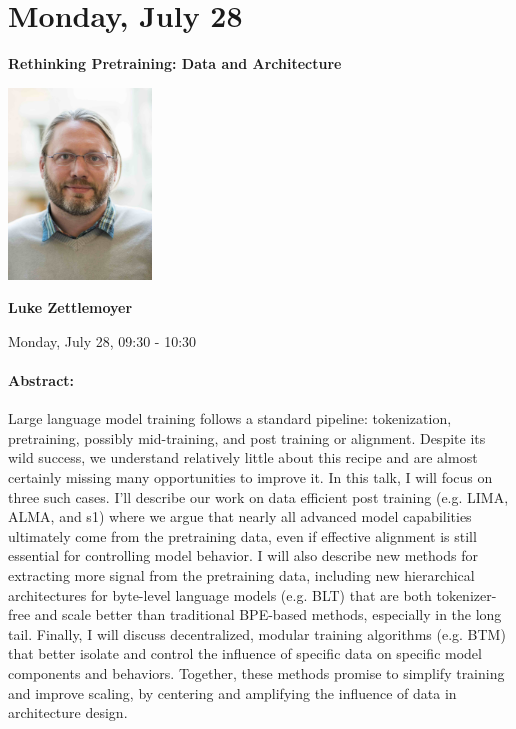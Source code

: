 \section{Monday, July 28}
\vspace*{0.2cm}

\begin{center}
    {\Large \textbf{Rethinking Pretraining: Data and Architecture}}
    
    \includegraphics[width=1.5in]{examples/acl25-handbook/invited_talks/luke.jpg}
    
    {\large \textbf{Luke Zettlemoyer}}

    Monday, July 28, 09:30 - 10:30
\end{center}

\paragraph{Abstract:}
Large language model training follows a standard pipeline: tokenization, pretraining, possibly mid-training, and post training or alignment. Despite its wild success, we understand relatively little about this recipe and are almost certainly missing many opportunities to improve it. In this talk, I will focus on three such cases. I’ll describe our work on data efficient post training (e.g. LIMA, ALMA, and s1) where we argue that nearly all advanced model capabilities ultimately come from the pretraining data, even if effective alignment is still essential for controlling model behavior. I will also describe new methods for extracting more signal from the pretraining data, including new hierarchical architectures for byte-level language models (e.g. BLT) that are both tokenizer-free and scale better than traditional BPE-based methods, especially in the long tail. Finally, I will discuss decentralized, modular training algorithms (e.g. BTM) that better isolate and control the influence of specific data on specific model components and behaviors. Together, these methods promise to simplify training and improve scaling, by centering and amplifying the influence of data in architecture design. 


